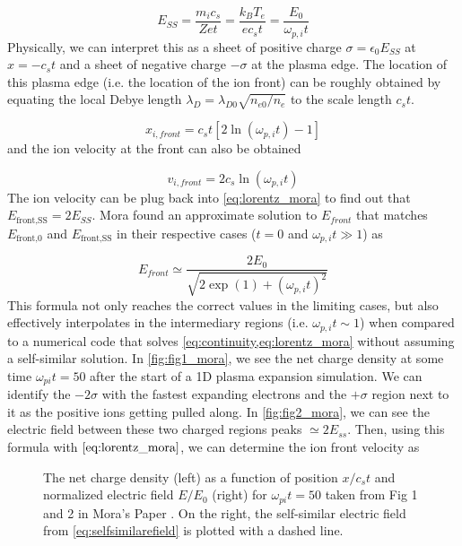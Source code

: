 \begin{equation}
	E_{SS} = \frac{m_i c_s}{Z e t} = \frac{k_B T_e}{e c_s t} = \frac{E_0}{\omega_{p,i} t} \label{eq:selfsimilarefield}
\end{equation}
Physically, we can interpret this as a sheet of positive charge $\sigma = \epsilon_0 E_{SS}$ at $x = - c_s t$ and a sheet of negative charge $-\sigma$ at the plasma edge. The location of this plasma edge (i.e. the location of the ion front) can be roughly obtained by equating the local Debye length $\lambda_D = \lambda_{D0} \sqrt{n_{e0}/n_e}$ to the scale length $c_s t$.

\begin{equation}
	x_{i, front} = c_s t [2 \ln(\omega_{p,i} t) - 1] \label{eq:mora_xfront}
\end{equation} 
and the ion velocity at the front can also be obtained 

\begin{equation}
	v_{i, front} = 2 c_s \ln(\omega_{p,i} t)
\end{equation}
The ion velocity can be plug back into \autoref{eq:lorentz_mora} to find out that $E_\text{front,SS} = 2 E_{SS}$. Mora found an approximate solution to $E_{front}$ that matches $E_\text{front,0}$ and $E_\text{front,SS}$ in their respective cases ($t = 0$ and $\omega_{p,i} t \gg 1$) as 

\begin{equation}
	E_{front} \simeq \frac{2 E_0}{\sqrt{2 \exp(1) + (\omega_{p,i} t)^2}}
\end{equation}
This formula not only reaches the correct values in the limiting cases, but also effectively interpolates in the intermediary regions (i.e. $\omega_{p,i} t \sim 1$) when compared to a numerical code that solves \cref{eq:continuity,eq:lorentz_mora} without assuming a self-similar solution. In \autoref{fig:fig1_mora}, we see the net charge density at some time $\omega_{pi} t = 50$ after the start of a 1D plasma expansion simulation. We can identify the $-2\sigma$ with the fastest expanding electrons and the $+\sigma$ region next to it as the positive ions getting pulled along. In \autoref{fig:fig2_mora}, we can see the electric field between these two charged regions peaks $\simeq 2 E_{ss}$. Then, using this formula with $\autoref{eq:lorentz_mora}$, we can determine the ion front velocity as 

\begin{figure}
	\centering 
	\caption{The net charge density (left) as a function of position $x / c_s t$ and normalized electric field $E/E_0$ (right) for $\omega_{pi} t = 50$ taken from Fig 1 and 2 in Mora's Paper \cite{Mora_2003_PRL}. On the right, the self-similar electric field from \autoref{eq:selfsimilarefield} is plotted with a dashed line.}
\end{figure}


